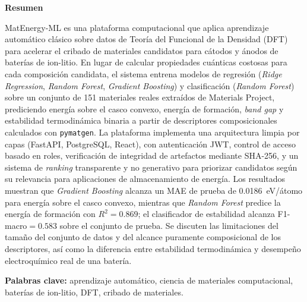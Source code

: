 \rhead{}
\lhead{}
\renewcommand{\headrulewidth}{0pt}
\begin{center}
 
    \textbf{Resumen}\\
\end{center}

\noindent
MatEnergy-ML es una plataforma computacional que aplica aprendizaje automático
clásico sobre datos de Teoría del Funcional de la Densidad (DFT) para acelerar
el cribado de materiales candidatos para cátodos y ánodos de baterías de
ion-litio. En lugar de calcular propiedades cuánticas costosas para cada
composición candidata, el sistema entrena modelos de regresión (\textit{Ridge
Regression}, \textit{Random Forest}, \textit{Gradient Boosting}) y clasificación
(\textit{Random Forest}) sobre un conjunto de 151 materiales reales extraídos de
Materials Project, prediciendo energía sobre el casco convexo, energía de
formación, \textit{band gap} y estabilidad termodinámica binaria a partir de
descriptores composicionales calculados con \texttt{pymatgen}. La plataforma
implementa una arquitectura limpia por capas (FastAPI, PostgreSQL, React), con
autenticación JWT, control de acceso basado en roles, verificación de
integridad de artefactos mediante SHA-256, y un sistema de \textit{ranking}
transparente y no generativo para priorizar candidatos según su relevancia
para aplicaciones de almacenamiento de energía. Los resultados muestran que
\textit{Gradient Boosting} alcanza un MAE de prueba de 0.0186~eV/átomo para
energía sobre el casco convexo, mientras que \textit{Random Forest} predice la
energía de formación con $R^2=0.869$; el clasificador de estabilidad alcanza
F1-macro$=0.583$ sobre el conjunto de prueba. Se discuten las limitaciones del
tamaño del conjunto de datos y del alcance puramente composicional de los
descriptores, así como la diferencia entre estabilidad termodinámica y
desempeño electroquímico real de una batería.

\vspace{0.6cm}
\noindent
\textbf{Palabras clave:} aprendizaje automático, ciencia de materiales
computacional, baterías de ion-litio, DFT, cribado de materiales.
